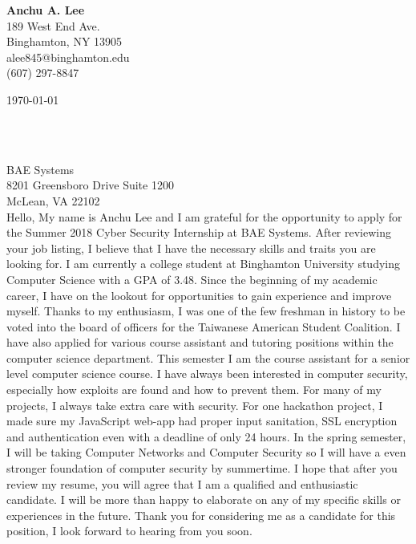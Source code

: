 \documentclass[12pt]{article}
\makeatletter
\newcommand{\firstname}{Anchu}
\newcommand{\lastname}{Lee}
\newcommand{\middlename}{A}
\newcommand{\addressA}{189 West End Ave.}
\newcommand{\addressB}{Binghamton, NY 13905}
\newcommand{\email}{alee845@binghamton.edu}
\newcommand{\phonenumber}{(607) 297-8847}
\newcommand{\university}{Binghamton University}
\newcommand{\gpa}{3.48}
\newcommand{\applyingposition}{Summer 2018 Cyber Security Internship}
\newcommand{\companyname}{BAE Systems}
\newcommand{\companyaddressA}{8201 Greensboro Drive Suite 1200}
\newcommand{\companyaddressB}{McLean, VA 22102}
\newcommand{\companyhiringmanager}{[Hiring Manager]}
\newcommand{\companyhiringmanageremail}{[Hiring Manager Email]}
\newcommand{\name}{\firstname{ }\middlename{. }\lastname}
\makeatother
\begin{document}
    \begin{center}
        {\Large\textbf{\name}}\\\addressA\\\addressB\\\email\\\phonenumber\\
    \end{center}
    \monthyear\today\\
\begin{hiringmgr}
    \companyhiringmanager\\
    \companyhiringmanageremail\\\newline
\end{hiringmgr}
    \companyname\\
    \companyaddressA\\
    \companyaddressB\\\newline
    Hello,\newline
    \indent My name is \firstname{ }\lastname{ }and I am grateful for the opportunity to
    apply for the \applyingposition{ }at \companyname. After reviewing your job listing,
    I believe that I have the necessary skills and traits you are looking for.\newline
    \indent I am currently a college student at \university{ }studying Computer Science with a 
    GPA of \gpa. Since the beginning of my academic career, I have on the lookout for opportunities 
    to gain experience and improve myself. Thanks to my enthusiasm, I was one of the few freshman 
    in history to be voted into the board of officers for the Taiwanese American Student Coalition. 
    I have also applied for various course assistant and tutoring positions within the computer 
    science department. This semester I am the course assistant for a senior level computer 
    science course.\newline
    \indent I have always been interested in computer security, especially how exploits
    are found and how to prevent them. For many of my projects, I always take extra care with
    security. For one hackathon project, I made sure my JavaScript web-app had proper input 
    sanitation, SSL encryption and authentication even with a deadline of only 24 hours. In the
    spring semester, I will be taking Computer Networks and Computer Security so I will have 
    a even stronger foundation of computer security by summertime.\newline
    \indent I hope that after you review my resume, you will agree that I am a qualified and
    enthusiastic candidate. I will be more than happy to elaborate on any of my specific skills or 
    experiences in the future. \newline
    \indent Thank you for considering me as a candidate for this position, I look forward to hearing
    from you soon.
\end{document}
